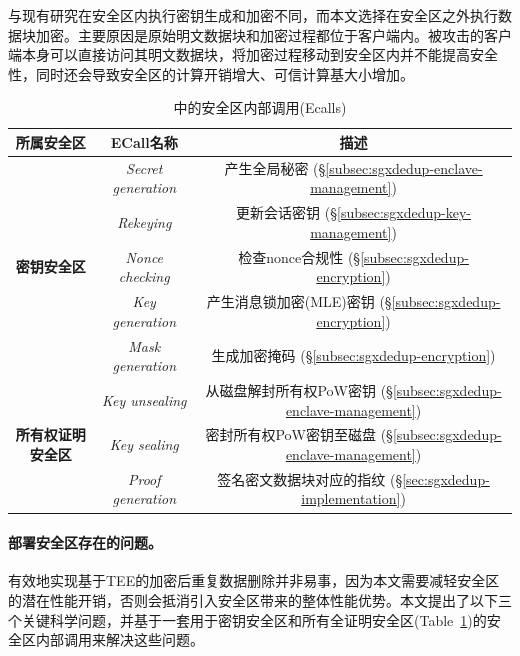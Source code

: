 与现有研究\cite{kim2019ShieldStore,fuhry20,djoko2019NEXUS}在安全区内执行密钥生成和加密不同，而本文选择在安全区之外执行数据块加密。主要原因是原始明文数据块和加密过程都位于客户端内。被攻击的客户端本身可以直接访问其明文数据块，将加密过程移动到安全区内并不能提高安全性，同时还会导致安全区的计算开销增大、可信计算基大小增加。

\begin{table}[!htb]
  \small
  \centering
  \begin{tabular}{ccc}
  \toprule
  {\bf 所属安全区} & {\bf ECall名称} & {\bf 描述}\\ 
  \midrule
  \multirow{5}{*}{\bf 密钥安全区}
  & \textit{ Secret generation} & 产生全局秘密 
  (\S\ref{subsec:sgxdedup-enclave-management}) \\
  & \textit{ Rekeying} & 更新会话密钥 
  (\S\ref{subsec:sgxdedup-key-management}) \\
  & \textit{ Nonce checking} & 检查nonce合规性 
  (\S\ref{subsec:sgxdedup-encryption}) \\
  & \textit{ Key generation} & 产生消息锁加密(MLE)密钥 (\S\ref{subsec:sgxdedup-encryption}) \\
  & \textit{ Mask generation} & 生成加密掩码 (\S\ref{subsec:sgxdedup-encryption}) \\
  \hline
  \multirow{3}{*}{\bf 所有权证明安全区}
  & \textit{ Key unsealing} & 从磁盘解封所有权PoW密钥 (\S\ref{subsec:sgxdedup-enclave-management}) \\
  & \textit{ Key sealing} & 密封所有权PoW密钥至磁盘 (\S\ref{subsec:sgxdedup-enclave-management}) \\
  & \textit{ Proof generation} & 签名密文数据块对应的指纹 
  (\S\ref{sec:sgxdedup-implementation}) \\
  \bottomrule
  \end{tabular}
  \caption{\sysnameS 中的安全区内部调用(Ecalls)}
  \label{tab:sgxdedup-ecall}
\end{table}

\paragraph*{部署安全区存在的问题。}有效地​​实现基于TEE的加密后重复数据删除并非易事，因为本文需要减轻安全区的潜在性能开销，否则会抵消引入安全区带来的整体性能优势。本文提出了以下三个关键科学问题，并基于一套用于密钥安全区和所有全证明安全区(Table~\ref{tab:sgxdedup-ecall})的安全区内部调用来解决这些问题。

